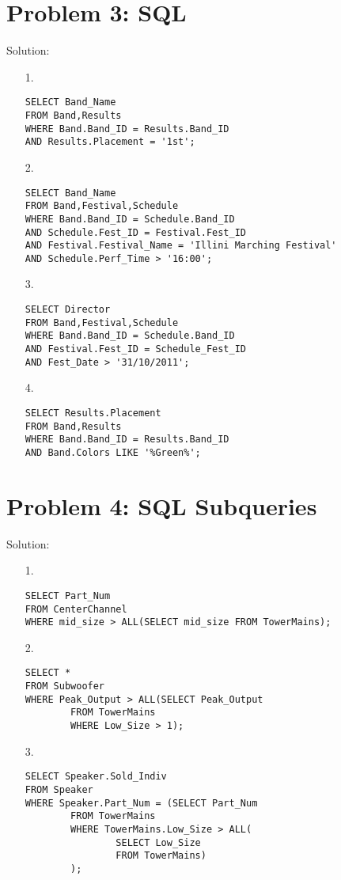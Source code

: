 \documentclass[letter,11pt]{article}
\begin{document}
\section*{Problem 3: SQL} Solution:
\begin{enumerate}
\item[1.]
\begin{verbatim}
SELECT Band_Name
FROM Band,Results
WHERE Band.Band_ID = Results.Band_ID
AND Results.Placement = '1st';
\end{verbatim}

\item[2.]
\begin{verbatim}
SELECT Band_Name
FROM Band,Festival,Schedule
WHERE Band.Band_ID = Schedule.Band_ID
AND Schedule.Fest_ID = Festival.Fest_ID
AND Festival.Festival_Name = 'Illini Marching Festival'
AND Schedule.Perf_Time > '16:00';
\end{verbatim}

\item[3.]
\begin{verbatim}
SELECT Director
FROM Band,Festival,Schedule
WHERE Band.Band_ID = Schedule.Band_ID
AND Festival.Fest_ID = Schedule_Fest_ID
AND Fest_Date > '31/10/2011';

\end{verbatim}

\item[4.]
\begin{verbatim}
SELECT Results.Placement
FROM Band,Results
WHERE Band.Band_ID = Results.Band_ID
AND Band.Colors LIKE '%Green%';

\end{verbatim}

\end{enumerate}

\section*{Problem 4: SQL Subqueries} Solution:
\begin{enumerate}
\item[1.]
\begin{verbatim}
SELECT Part_Num
FROM CenterChannel
WHERE mid_size > ALL(SELECT mid_size FROM TowerMains);

\end{verbatim}

\item[2.]
\begin{verbatim}
SELECT *
FROM Subwoofer
WHERE Peak_Output > ALL(SELECT Peak_Output
        FROM TowerMains
        WHERE Low_Size > 1);

\end{verbatim}

\item[3.]
\begin{verbatim}
SELECT Speaker.Sold_Indiv
FROM Speaker
WHERE Speaker.Part_Num = (SELECT Part_Num
        FROM TowerMains
        WHERE TowerMains.Low_Size > ALL(
                SELECT Low_Size
                FROM TowerMains)
        );

\end{verbatim}

\end{enumerate}
\end{document}
